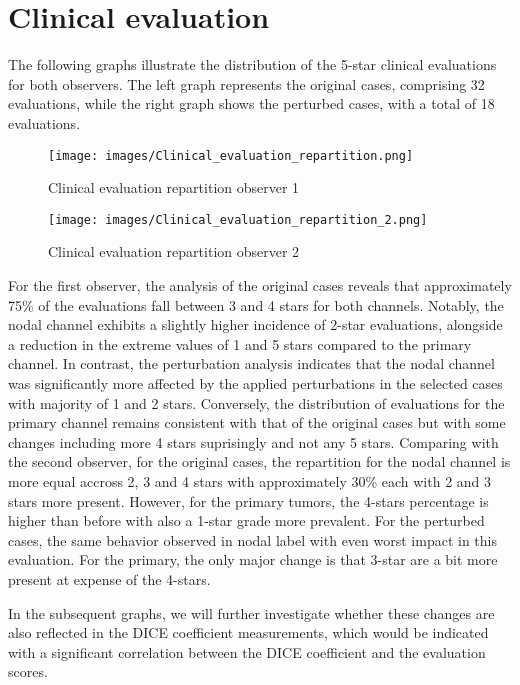 \newpage
\section{Clinical evaluation}
The following graphs illustrate the distribution of the 5-star clinical evaluations for both observers. The left graph represents the original cases, comprising 32 evaluations, while the right graph shows the perturbed cases, with a total of 18 evaluations.
\begin{figure}[ht]
    \centering
    \texttt{[image: images/Clinical\_evaluation\_repartition.png]}
    \caption{Clinical evaluation repartition observer 1}
    \label{fig:three_subfigures}
\end{figure}

\begin{figure}[ht]
    \centering
    \texttt{[image: images/Clinical\_evaluation\_repartition\_2.png]}
    \caption{Clinical evaluation repartition observer 2}
    \label{fig:three_subfigures}
\end{figure}

\newpage

For the first observer, the analysis of the original cases reveals that approximately 75\% of the evaluations fall between 3 and 4 stars for both channels. Notably, the nodal channel exhibits a slightly higher incidence of 2-star evaluations, alongside a reduction in the extreme values of 1 and 5 stars compared to the primary channel.
In contrast, the perturbation analysis indicates that the nodal channel was significantly more affected by the applied perturbations in the selected cases with majority of 1 and 2 stars. Conversely, the distribution of evaluations for the primary channel remains consistent with that of the original cases but with some changes including more 4 stars suprisingly and not any 5 stars.
Comparing with the second observer, for the original cases, the repartition for the nodal channel is more equal accross 2, 3 and 4 stars with approximately 30\% each with 2 and 3 stars more present.
However, for the primary tumors, the 4-stars percentage is higher than before with also a 1-star grade more prevalent. 
For the perturbed cases, the same behavior observed in nodal label with even worst impact in this evaluation. For the primary, the only major change is that 3-star are a bit more present at expense of the 4-stars.

In the subsequent graphs, we will further investigate whether these changes are also reflected in the DICE coefficient measurements, which would be indicated with a significant correlation between the DICE coefficient and the evaluation scores.


